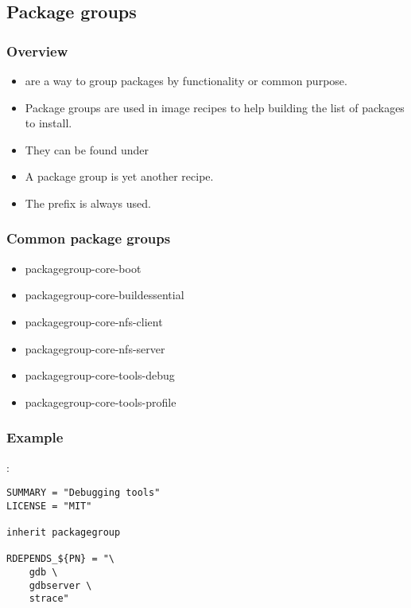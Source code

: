 \subsection{Package groups}

\begin{frame}
  \frametitle{Overview}
  \begin{itemize}
    \item {} are a way to group packages by
      functionality or common purpose.
    \item Package groups are used in image recipes to help building
      the list of packages to install.
    \item They can be found under
    \item A package group is yet another recipe.
    \item The prefix  is always used.
  \end{itemize}
\end{frame}

\begin{frame}
  \frametitle{Common package groups}
  \begin{itemize}
    \item packagegroup-core-boot
    \item packagegroup-core-buildessential
    \item packagegroup-core-nfs-client
    \item packagegroup-core-nfs-server
    \item packagegroup-core-tools-debug
    \item packagegroup-core-tools-profile
  \end{itemize}
\end{frame}

\begin{frame}[fragile]
  \frametitle{Example}
  :
  \begin{block}{}
    \begin{verbatim}
SUMMARY = "Debugging tools"
LICENSE = "MIT"

inherit packagegroup

RDEPENDS_${PN} = "\
    gdb \
    gdbserver \
    strace"
    \end{verbatim}
  \end{block}
\end{frame}
